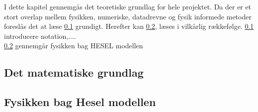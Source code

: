 I dette kapitel gennemgås det teoretiske grundlag for hele projektet. Da der er et stort overlap mellem fysikken, numeriske, datadrevne og fysik informede metoder 
foreslås det at læse \ref{ch2_1} grundigt. Herefter kan \ref{ch2_2}, læses i vilkårlig rækkefølge. 
\ref{ch2_1} introducere notation,....\\
\ref{ch2_2} gennemgår fysikken bag HESEL modellen\\



\subsection{Det matematiske grundlag} \label{ch2_1}



\newpage
\subsection{Fysikken bag Hesel modellen} \label{ch2_2}


% 

% 


